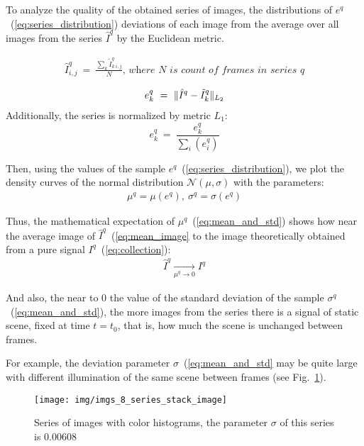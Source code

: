 \documentclass[runningheads]{llncs}
\begin{document}
To analyze the quality of the obtained series of images, the distributions of $e^q$~(\ref{eq:series_distribution}) deviations of each image from the average over all images from the series $\hat{I}^q$ by the Euclidean metric.

\begin{eqnarray}\label{eq:mean_image}
\hat{I}^q_{i,j}\ =\ \frac{\sum_{k}\tilde{I}^q_{k\ i,j}}{N}\textit{, where }N\textit{ is count of frames in series }q
\end{eqnarray}

\begin{eqnarray}\label{eq:series_distribution}
e^q_k\ =\ \Arrowvert \hat{I}^q - \tilde{I}^q_k \Arrowvert_{L_2}
\end{eqnarray}
Additionally, the series is normalized by metric $L_1$:
$$e^q_k\ =\ \frac{e^q_k}{\sum_{i}(e^q_i)}$$

Then, using the values of the sample $e^q$~(\ref{eq:series_distribution}), we plot the density curves of the normal distribution $\mathcal{N}(\mu, \sigma)$ with the parameters:
\begin{eqnarray}\label{eq:mean_and_std}
\mu^q = \mu(e^q),\ \sigma^q = \sigma(e^q)
\end{eqnarray}

Thus, the mathematical expectation of $\mu^q$~(\ref {eq:mean_and_std}) shows how near the average image of $\hat{I}^q$~(\ref{eq:mean_image}  to the image theoretically obtained from a pure signal $I^q$~(\ref{eq:collection}): 
\begin{eqnarray}\label{eq:mean_image_approximation}
\hat{I}^q \xrightarrow[\mu^q \rightarrow 0]{} I^q
\end{eqnarray}

And also, the near to $0$ the value of the standard deviation of the sample $\sigma^q$~(\ref{eq:mean_and_std}), the more images from the series there is a signal of static scene, fixed at time $ t = t_0 $, that is, how much the scene is unchanged between frames.

For example, the deviation parameter $\sigma$~(\ref{eq:mean_and_std} may be quite large with different illumination of the same scene between frames (see Fig.~\ref{fig:hists_comparision}).

\begin{figure}
	\centering
	\texttt{[image: img/imgs\_8\_series\_stack\_image]}
	\caption{Series of images with color histograms, the parameter $\sigma$ of this series is $0.00608$}
	\label{fig:hists_comparision}
\end{figure}
\end{document}
